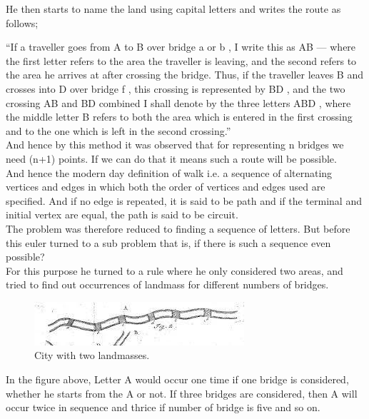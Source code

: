 \documentclass[acmsmall]{acmart}
\begin{document}
He then starts to name the land using capital letters and writes the route as follows;

“If a traveller goes from A to B over bridge a or b , I write this as AB — where the first letter refers to the
area the traveller is leaving, and the second refers to the area he arrives at after crossing the bridge. Thus, if
the traveller leaves B and crosses into D over bridge f , this crossing is represented by BD , and the two
crossing AB and BD combined I shall denote by the three letters ABD , where the middle letter B refers to
both the area which is entered in the first crossing and to the one which is left in the second crossing.”\\

And hence by this method it was observed that for representing n bridges we need (n+1)
points. If we can do that it means such a route will be possible.\\

And hence the modern day definition of walk i.e. a sequence of alternating vertices and
edges in which both the order of vertices and edges used are specified. And if no edge is
repeated, it is said to be path and if the terminal and initial vertex are equal, the path is
said to be circuit.\\

The problem was therefore reduced to finding a sequence of letters. But before this euler
turned to a sub problem that is, if there is such a sequence even possible?\\

For this purpose he turned to a rule where he only considered two areas, and tried to find
out occurrences of landmass for different numbers of bridges.\\

\begin{figure}[h]
  \centering
  \includegraphics[width=\linewidth]{1t}
  \caption{City with two landmasses.}
\end{figure}


In the figure above, Letter A would occur one time if one bridge is considered, whether he
starts from the A or not. If three bridges are considered, then A will occur twice in sequence
and thrice if number of bridge is five and so on.\\
\end{document}
